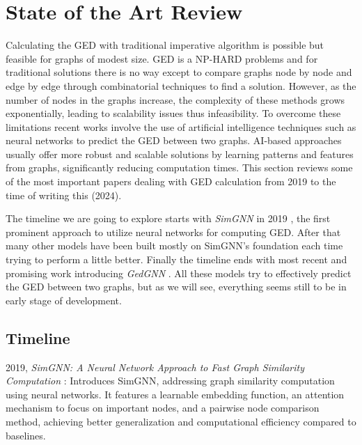 \documentclass[../Thesis.tex]{subfiles}
\begin{document}
	
	\section{State of the Art Review}
	\label{sec:state_of_the_art_review}
	
	Calculating the GED with traditional imperative algorithm is possible but feasible for graphs of modest size. GED is a NP-HARD problems and for traditional solutions there is no way except to compare graphs node by node and edge by edge through combinatorial techniques to find a solution. However, as the number of nodes in the graphs increase, the complexity of these methods grows exponentially, leading to scalability issues thus infeasibility. To overcome these limitations recent works involve the use of artificial intelligence techniques such as neural networks to predict the GED between two graphs. AI-based approaches usually offer more robust and scalable solutions by learning patterns and features from graphs, significantly reducing computation times. This section reviews some of the most important papers dealing with GED calculation from 2019 to the time of writing this (2024).

	The timeline we are going to explore starts with \textit{SimGNN} in 2019 \cite{simgnn__a_neural_network_approach_to_fast_graph_similarity_computation}, the first prominent approach to utilize neural networks for computing GED. 
	After that many other models have been built mostly on SimGNN's foundation each time trying to perform a little better.
	Finally the timeline ends with most recent and promising work introducing \textit{GedGNN} \cite{computing_graph_edit_distance_via_neural_graph_matching}. All these models try to effectively predict the GED between two graphs, but as we will see, everything seems still to be in early stage of development.
	
	\subsection{Timeline}
	\label{subsec:timeline}
	
	2019, \textit{SimGNN: A Neural Network Approach to Fast Graph Similarity Computation} \cite{simgnn__a_neural_network_approach_to_fast_graph_similarity_computation}: Introduces SimGNN, addressing graph similarity computation using neural networks. It features a learnable embedding function, an attention mechanism to focus on important nodes, and a pairwise node comparison method, achieving better generalization and computational efficiency compared to baselines.
	
\end{document}

